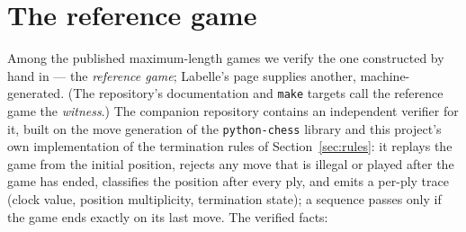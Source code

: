 \documentclass[11pt]{article}
\theoremstyle{definition}
\theoremstyle{remark}
\theoremstyle{plain}
\begin{document}
\appendix

\section{The reference game}\label{app:witness}

Among the published maximum-length games we verify the one constructed
by hand
in \cite{murphy2020longest} --- the \emph{reference game}; Labelle's page
\cite{labelle2015longest} supplies another, machine-generated. (The
repository's documentation and \texttt{make} targets call the reference
game the \emph{witness}.) The companion repository \cite{repo} contains
an independent verifier for it, built on the move generation of the
\texttt{python-chess} library \cite{pythonchess} and this project's own
implementation of the termination rules of Section~\ref{sec:rules}: it
replays the game from the initial position, rejects any move that is
illegal or played after the game has ended, classifies the position
after every ply, and emits a per-ply trace (clock value, position
multiplicity, termination state); a sequence passes only if the game
ends exactly on its last move. The verified facts:
\end{document}
